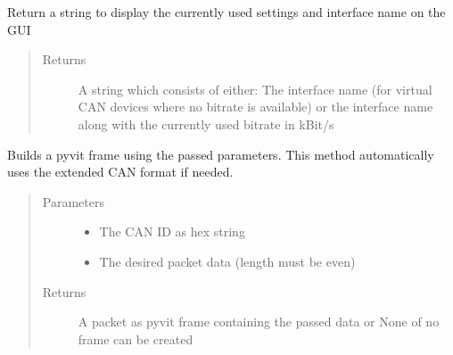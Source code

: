 \documentclass[letterpaper,10pt,english]{sphinxmanual}
\begin{document}
\begin{fulllineitems}
\begin{fulllineitems}
\end{fulllineitems}


\begin{fulllineitems}
\label{\detokenize{src:src.CANData.CANData.toString}}
Return a string to display the currently used settings and interface name on the GUI
\begin{quote}\begin{description}
\item[{Returns}] \leavevmode
A string which consists of either: The interface name (for virtual CAN devices where no bitrate is available)
or the interface name along with the currently used bitrate in kBit/s

\end{description}\end{quote}

\end{fulllineitems}


\begin{fulllineitems}
\label{\detokenize{src:src.CANData.CANData.tryBuildPacket}}
Builds a pyvit frame using the passed parameters.
This method automatically uses the extended CAN format if needed.
\begin{quote}\begin{description}
\item[{Parameters}] \leavevmode\begin{itemize}
\item {} 
 \textendash{} The CAN ID as hex string

\item {} 
 \textendash{} The desired packet data (length must be even)

\end{itemize}

\item[{Returns}] \leavevmode
A packet as pyvit frame containing the passed data or None of no frame can be created

\end{description}\end{quote}

\end{fulllineitems}


\end{fulllineitems}
\end{document}
